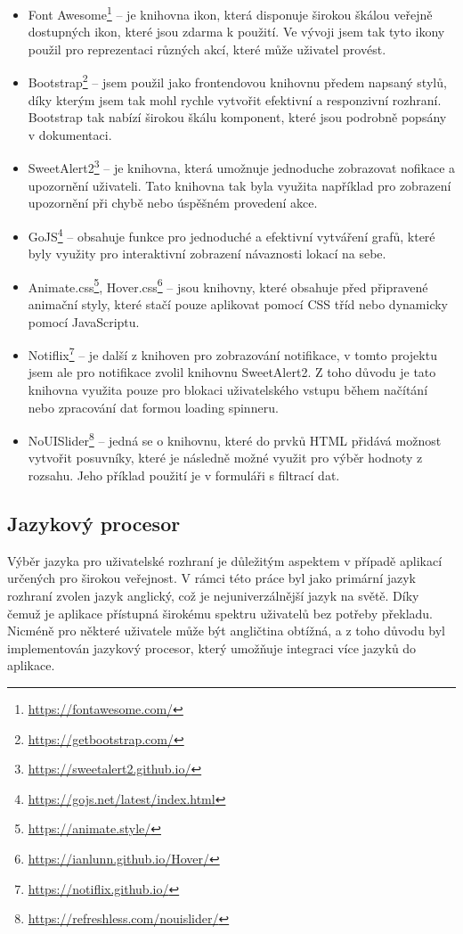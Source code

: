 \begin{itemize}
    \item Font Awesome\footnote{\href{https://fontawesome.com/}{https://fontawesome.com/}} -- je knihovna ikon, která disponuje širokou škálou veřejně dostupných ikon, které jsou zdarma k použití. Ve vývoji jsem tak tyto ikony použil pro reprezentaci různých akcí, které může uživatel provést.
    \item Bootstrap\footnote{\href{https://getbootstrap.com/}{https://getbootstrap.com/}} -- jsem použil jako frontendovou knihovnu předem napsaný stylů, díky kterým jsem tak mohl rychle vytvořit efektivní a responzivní rozhraní. Bootstrap tak nabízí širokou škálu komponent, které jsou podrobně popsány v dokumentaci.
    \item SweetAlert2\footnote{\href{https://sweetalert2.github.io/}{https://sweetalert2.github.io/}} -- je knihovna, která umožnuje jednoduche zobrazovat nofikace a upozornění uživateli. Tato knihovna tak byla využita například pro zobrazení upozornění při chybě nebo úspěšném provedení akce.
    \item GoJS\footnote{\href{https://gojs.net/latest/index.html}{https://gojs.net/latest/index.html}} -- obsahuje funkce pro jednoduché a efektivní vytváření grafů, které byly využity pro interaktivní zobrazení návaznosti lokací na sebe.
    \item Animate.css\footnote{\href{https://animate.style/}{https://animate.style/}}, Hover.css\footnote{\href{https://ianlunn.github.io/Hover/}{https://ianlunn.github.io/Hover/}} -- jsou knihovny, které obsahuje před připravené animační styly, které stačí pouze aplikovat pomocí CSS tříd nebo dynamicky pomocí JavaScriptu.
    \item Notiflix\footnote{\href{https://notiflix.github.io/}{https://notiflix.github.io/}} -- je další z knihoven pro zobrazování notifikace, v tomto projektu jsem ale pro notifikace zvolil knihovnu SweetAlert2. Z toho důvodu je tato knihovna využita pouze pro blokaci uživatelského vstupu během načítání nebo zpracování dat formou loading spinneru.
    \item NoUISlider\footnote{\href{https://refreshless.com/nouislider/}{https://refreshless.com/nouislider/}} -- jedná se o knihovnu, které do prvků HTML přidává možnost vytvořit posuvníky, které je následně možné využit pro výběr hodnoty z rozsahu. Jeho příklad použití je v formuláři s filtrací dat.
\end{itemize}

\subsection{Jazykový procesor}
\label{subsec:implementation-technologies-compiler}
Výběr jazyka pro uživatelské rozhraní je důležitým aspektem v případě aplikací určených pro širokou veřejnost. V rámci této práce byl jako primární jazyk rozhraní zvolen jazyk anglický, což je nejuniverzálnější jazyk na světě. Díky čemuž je aplikace přístupná širokému spektru uživatelů bez potřeby překladu. Nicméně pro některé uživatele může být angličtina obtížná, a z toho důvodu byl implementován jazykový procesor, který umožňuje integraci více jazyků do aplikace.

